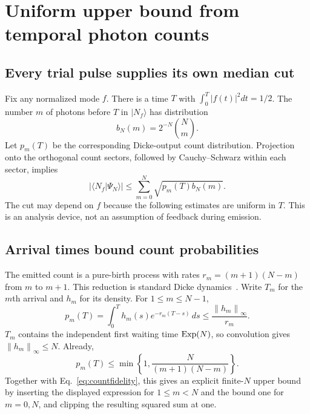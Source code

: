 \documentclass[11pt,a4paper]{article}
\newcommand{\norm}[1]{\left\lVert#1\right\rVert}
\begin{document}
\section{Uniform upper bound from temporal photon counts}
\label{sec:upper}
\subsection{Every trial pulse supplies its own median cut}
Fix any normalized mode $f$. There is a time $T$ with $\int_0^T|f(t)|^2dt=1/2$. The number $m$ of photons before $T$ in $|N_f\rangle$ has distribution
\begin{equation}b_N(m)=2^{-N}\binom Nm.\end{equation}
Let $p_m(T)$ be the corresponding Dicke-output count distribution. Projection onto the orthogonal count sectors, followed by Cauchy--Schwarz within each sector, implies
\begin{equation}
 |\langle N_f|\Psi_N\rangle|
 \le\sum_{m=0}^N\sqrt{p_m(T)b_N(m)}.
\label{eq:countfidelity}
\end{equation}
The cut may depend on $f$ because the following estimates are uniform in $T$. This is an analysis device, not an assumption of feedback during emission.

\subsection{Arrival times bound count probabilities}
The emitted count is a pure-birth process with rates $r_m=(m+1)(N-m)$ from $m$ to $m+1$. This reduction is standard Dicke dynamics~\cite{malz}. Write $T_m$ for the $m$th arrival and $h_m$ for its density. For $1\le m\le N-1$,
\begin{equation}
 p_m(T)=\int_0^T h_m(s)e^{-r_m(T-s)}\,ds
 \le\frac{\norm{h_m}_\infty}{r_m}.
\label{eq:dwell}
\end{equation}
$T_m$ contains the independent first waiting time ${\rm Exp}(N)$, so convolution gives $\norm{h_m}_\infty\le N$. Already,
\begin{equation}
 p_m(T)\le\min\!\left\{1,\frac{N}{(m+1)(N-m)}\right\}.
\end{equation}
Together with Eq.~\eqref{eq:countfidelity}, this gives an explicit finite-$N$ upper bound by inserting the displayed expression for $1\le m<N$ and the bound one for $m=0,N$, and clipping the resulting squared sum at one.
\end{document}
